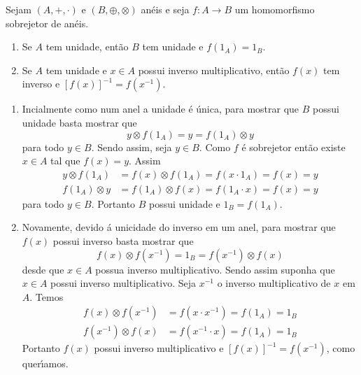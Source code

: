 \begin{proposicao}
	Sejam $(A, +, \cdot)$ e $(B, \oplus, \otimes)$ an\'eis e seja $f : A \to B$ um homomorfismo sobrejetor de an\'eis.
	\begin{enumerate}[label={\roman*})]
		\item Se $A$ tem unidade, ent\~ao $B$ tem unidade e $f(1_A) = 1_B$.
		\item Se $A$ tem unidade e $x \in A$ possui inverso multiplicativo, ent\~ao $f(x)$ tem inverso e $[f(x)]^{-1} = f(x^{-1})$.
	\end{enumerate}
\end{proposicao}
\begin{prova}
	\begin{enumerate}[label={\roman*})]
		\item Incialmente como num anel a unidade \'e \'unica, para mostrar que $B$ possui unidade basta mostrar que
		\[
			y\otimes f(1_A) = y = f(1_A)\otimes y
		\]
		para todo $y \in B$. Sendo assim, seja $y \in B$. Como $f$ \'e sobrejetor ent\~ao existe $x \in A$ tal que $f(x) = y$. Assim
		\begin{align*}
			y\otimes f(1_A) &= f(x) \otimes f(1_A) = f(x\cdot 1_A) = f(x) = y\\
			f(1_A)\otimes y &= f(1_A) \otimes f(x) = f(1_A\cdot x) = f(x) = y
		\end{align*}
		para todo $y \in B$. Portanto $B$ possui unidade e $1_B = f(1_A)$.

		\item Novamente, devido \'a unicidade do inverso em um anel, para mostrar que $f(x)$ possui inverso basta mostrar que
		\[
			f(x)\otimes f(x^{-1}) = 1_B = f(x^{-1})\otimes f(x)
		\]
		desde que $x \in A$ possua inverso multiplicativo. Sendo assim suponha que $x \in A$ possui inverso multiplicativo. Seja $x^{-1}$ o inverso multiplicativo de $x$ em $A$. Temos
		\begin{align*}
			f(x)\otimes f(x^{-1}) &= f(x\cdot x^{-1}) = f(1_A) = 1_B\\
			f(x^{-1})\otimes f(x) &= f(x^{-1}\cdot x) = f(1_A) = 1_B
		\end{align*}
		Portanto $f(x)$ possui inverso multiplicativo e $[f(x)]^{-1} = f(x^{-1})$, como quer{\'\i}amos.
	\end{enumerate}
\end{prova}


